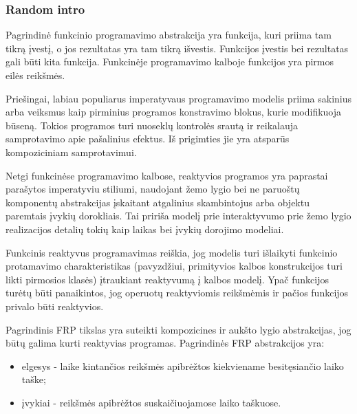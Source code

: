 
\subsubsection{Random intro}

Pagrindinė funkcinio programavimo abstrakcija yra funkcija, kuri priima tam tikrą įvestį, o jos rezultatas yra tam tikrą išvestis. Funkcijos įvestis bei rezultatas gali būti kita funkcija. Funkcinėje programavimo kalboje funkcijos yra pirmos eilės reikšmės.

Priešingai, labiau populiarus imperatyvaus programavimo modelis priima sakinius arba veiksmus kaip pirminius programos konstravimo blokus, kurie modifikuoja būseną. Tokios programos turi nuoseklų kontrolės srautą ir reikalauja samprotavimo apie pašalinius efektus. Iš prigimties jie yra atsparūs kompoziciniam samprotavimui.

Netgi funkcinėse programavimo kalbose, reaktyvios programos yra paprastai parašytos imperatyviu stiliumi, naudojant žemo lygio bei ne paruoštų komponentų abstrakcijas įskaitant atgalinius skambintojus arba objektu paremtais įvykių dorokliais. Tai pririša modelį prie interaktyvumo prie žemo lygio realizacijos detalių tokių kaip laikas bei įvykių dorojimo modeliai.

Funkcinis reaktyvus programavimas reiškia, jog modelis turi išlaikyti funkcinio protamavimo charakteristikas (pavyzdžiui, primityvios kalbos konstrukcijos turi likti pirmosios klasės) įtraukiant reaktyvumą į kalbos modelį. Ypač funkcijos turėtų būti panaikintos, jog operuotų reaktyviomis reikšmėmis ir pačios funkcijos privalo būti reaktyvios.

Pagrindinis FRP tikslas yra suteikti kompozicines ir aukšto lygio abstrakcijas, jog būtų galima kurti reaktyvias programas. Pagrindinės FRP abstrakcijos yra:

\begin{itemize}

	\item elgesys - laike kintančios reikšmės apibrėžtos kiekviename besitęsiančio laiko taške;

	\item įvykiai - reikšmės apibrėžtos suskaičiuojamose laiko taškuose.

\end{itemize}

